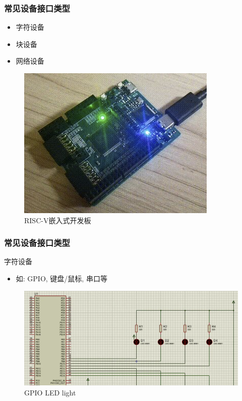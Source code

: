 \begin{frame}[fragile]
    \frametitle{常见设备接口类型}
    \begin{itemize}
    \item 字符设备
    \item 块设备
    \item 网络设备
    \end{itemize}
    \begin{figure}
    \includegraphics[width=0.4\linewidth]{figs/embed-dev.png}
    \caption{RISC-V嵌入式开发板}
\end{figure}
\end{frame}
% 
% 
% 

\begin{frame}[fragile]
    \frametitle{常见设备接口类型}
    字符设备
    \begin{itemize}
        \item 如: GPIO, 键盘/鼠标, 串口等
    \end{itemize}
    \begin{figure}
        \includegraphics[width=0.8\linewidth]{figs/char-led.png}
          \caption{GPIO LED light}
    \end{figure}
\end{frame}

